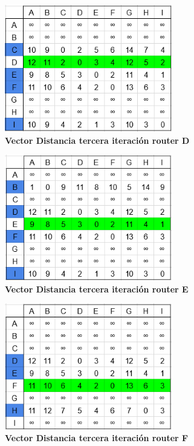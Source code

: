 \documentclass[12pt]{article}
\begin{document}
\begin{figure}[H] 
\centering 
\includegraphics[width=0.65\textwidth]{imagenes/2D3.png} \caption{\small \textbf{Vector Distancia tercera iteración router D}}
\label{fig:diagrama_38} 
\end{figure}
\begin{figure}[H] 
\centering 
\includegraphics[width=0.65\textwidth]{imagenes/2E3.png} \caption{\small \textbf{Vector Distancia tercera iteración router E}}
\label{fig:diagrama_39} 
\end{figure}
\begin{figure}[H] 
\centering 
\includegraphics[width=0.65\textwidth]{imagenes/2F3.png} \caption{\small \textbf{Vector Distancia tercera iteración router F}}
\label{fig:diagrama_40} 
\end{figure}
\end{document}

